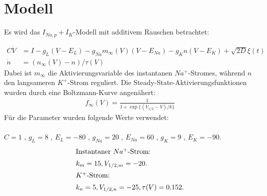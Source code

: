 \documentclass[12pt,a4paper]{article}
\begin{document}

\thispagestyle{empty}
\newpage
\tableofcontents
\thispagestyle{empty}
\newpage
{}
\section{Modell}
Es wird das $I_{Na,p}+I_K$-Modell mit additivem Rauschen betrachtet:

\begin{align*}
C\dot{V} &= I - g_L(V-E_L) - g_{Na}m_{\infty}(V)(V-E_{Na}) - g_Kn(V-E_K)+\sqrt{2D}\xi(t)\\
\dot{n} &= (n_{\infty}(V)-n)/\tau(V)
\end{align*}
Dabei ist $m_{\infty}$ die Aktivierungsvariable des instantanen $Na^+$-Stromes, während $n$ den langsameren $K^+$-Strom reguliert. Die Steady-State-Aktivierungsfunktionen wurden durch eine Boltzmann-Kurve angenähert:
\begin{align*}
f_{\infty}(V) = \frac{1}{1+\exp\{(V_{1/2}-V)/k\}}
\end{align*}
Für die Parameter wurden folgende Werte verwendet:\\\\
$C=1$ , $g_L=8$ , $E_L=-80$ , $g_{Na}=20$ , $E_{Na}=60$ , $g_K=9$ , $E_K=-90$.
\begin{align*}
\intertext{Instantaner $Na^+$-Strom:} &k_m=15 , V_{1/2,m}=-20. 
\\
\intertext{$K^+$-Strom:} &k_n=5 , V_{1/2,n}=-25 , \tau(V)=0.152.
\end{align*}
\end{document}
